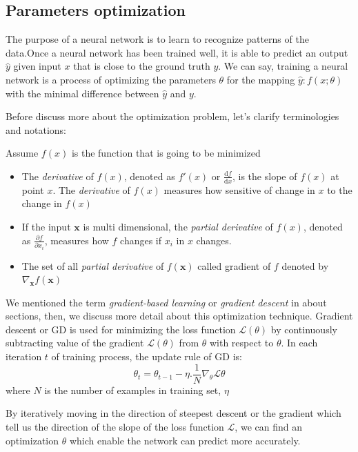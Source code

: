 \subsection{Parameters optimization}
\hspace{0.45cm}The purpose of a neural network is to learn to recognize patterns of the data.Once a neural network has been trained well, it is able to predict an output $\hat{y}$ given input $x$ that is close to the ground truth $y$. We can say, training a neural network is a process of optimizing the parameters $\theta$ for the mapping $\hat{y} : f(x;\theta)$ with the minimal difference between $\hat{y}$ and $y$.\par
Before discuss more about the optimization problem, let's clarify terminologies and notations:\par
Assume $f(x)$ is the function that is going to be minimized
\begin{itemize}
    \item The \textit{derivative} of $f(x)$, denoted as $f'(x)$ or $\frac{\text{d}f}{\text{d}x}$, is the slope of $f(x)$ at point $x$. The \textit{derivative} of $f(x)$ measures how sensitive of change in $x$ to the change in $f(x)$
    \item If the input $\pmb{x}$ is multi dimensional, the \textit{partial derivative} of $f(x)$, denoted as $\frac{\partial f}{\partial x_i}$, measures how $f$ changes if $x_i$ in $x$ changes.
    \item The set of all \textit{partial derivative} of $f(\pmb{x})$ called gradient of $f$ denoted by $\nabla_{\pmb{x}} f(\pmb{x})$
\end{itemize}
\par We mentioned the term \textit{gradient-based learning} or \textit{gradient descent} in about sections, then, we discuss more detail about this optimization technique. Gradient descent or \acrshort{GD} is used for 
minimizing the loss function $\mathcal{L}(\theta)$ by continuously subtracting value of the gradient $\mathcal{L}(\theta)$ from $\theta$ with respect to $\theta$\cite{Goodfellow-et-al-2016}. In each iteration $t$ of training process, the update rule of GD is:
\begin{equation}
    \theta_t = \theta_{t-1} - \eta . \frac{1}{N}\nabla_{\theta}\mathcal{L}\theta
\end{equation}
where $N$ is the number of examples in training set, $\eta$
\par By iteratively moving in the direction of steepest descent or the gradient which tell us the direction of the slope of the loss function  $\mathcal{L}$, we can find an optimization $\theta$ which enable the network can predict more accurately.\par
